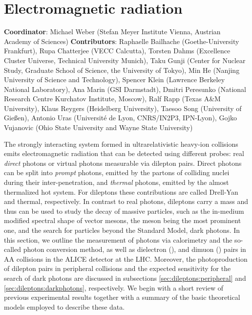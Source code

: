 \documentclass[../report.tex]{subfiles}
\begin{document}
\section{Electromagnetic radiation}
\label{chapter:electromagnetic_radiation}

\textbf{Coordinator}: Michael Weber (Stefan Meyer Institute Vienna, Austrian Academy of Sciences) 
\linebreak
\textbf{Contributors}: 
		Raphaelle Bailhache (Goethe-University Frankfurt), 
        Rupa Chatterjee (VECC Calcutta),
		Torsten Dahms (Excellence Cluster Universe, Technical University Munich), 
		Taku Gunji (Center for Nuclear Study, Graduate School of Science, the University of Tokyo), 
        Min He (Nanjing University of Science and Technology),
        Spencer Klein (Lawrence Berkeley National Laboratory), 
        Ana Marin (GSI Darmstadt), 
        Dmitri Peresunko (National Research Centre Kurchatov Institute, Moscow),  
        Ralf Rapp (Texas A\&M University), 
        Klaus Reygers (Heidelberg University), 
        Taesoo Song (University of Gie{\ss}en), 
        Antonio Uras (Universit{\'e} de Lyon, CNRS/IN2P3, IPN-Lyon),
        Gojko Vujanovic (Ohio State University and Wayne State University)


The strongly interacting system formed in ultrarelativistic heavy-ion collisions 
emits electromagnetic radiation that can be detected using different probes: real {\it direct} photons %
or virtual photons measurable via dilepton pairs. 
Direct photons can be split into {\it prompt} photons, emitted by the partons of colliding nuclei during their inter-penetration, and {\it thermal} photons, emitted by the almost thermalized hot system. 
For dileptons these contributions are called Drell-Yan and thermal, respectively.
In contrast to real photons, dileptons carry a mass and thus can be used to study the decay of massive particles, such as the in-medium modified spectral shape of vector mesons, the \PGr meson being the most prominent one, and the search for particles beyond the Standard Model, \eg dark photons. In this section, we outline the measurement of photons via calorimetry and the so-called photon conversion method, as well as dielectron (\Pepem), and dimuon (\PGmpGmm) pairs in AA collisions in the ALICE detector at the LHC. Moreover, the photoproduction of dilepton pairs in peripheral collisions and the expected sensitivity for the search of dark photons are discussed in subsections \ref{sec:dileptons:peripheral} and \ref{sec:dileptons:darkphotons}, respectively. We begin with a short review of previous experimental results together with a summary of the basic theoretical models employed to describe these data.
\end{document}

